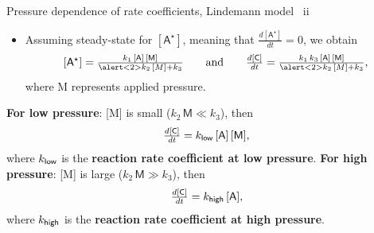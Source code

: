 \begin{frame}{Pressure dependence of rate coefficients, Lindemann model \, ii}
	\begin{itemize}
		\item Assuming steady-state for $\mathsf{[A^\star]}$, meaning that $\tfrac{d[\mathsf{A^\star}]}{dt} = 0$, we obtain
		\[
		\mathsf{[A^\star]} = \tfrac{k_1 \, \mathsf{[A]\, [M]}}{\alert<2>{k_2 \, [M]} + k_3} \qquad \mbox{and}  \qquad
		\tfrac{d\mathsf{[C]}}{dt} = \tfrac{k_1 \, k_3 \, \mathsf{[A]\, [M]}}{\alert<2>{k_2 \, [M]}  + k_3}, 
		\]
		where M represents applied pressure.\\[5pt]
	\end{itemize}
    \vskip 20pt
	\lcol
	{\bf For low pressure}: [M] is small ($k_2\, \mathsf{M} \ll k_3$), then 
	\[	
	\tfrac{d\mathsf{[C]}}{dt} = k_{\sf low} \, \mathsf{[A]\, [M]},
	\]
	where $k_{\sf low}$ is the {\bf reaction rate coefficient at low pressure}.
	\rcol
	{\bf For high pressure}: [M] is large  ($k_2\, \mathsf{M} \gg k_3$), then 
	\[	
	\tfrac{d\mathsf{[C]}}{dt} = k_{\sf high} \, \mathsf{[A]},
	\]
	where $k_{\sf high} $ is the {\bf reaction rate coefficient at high pressure}.
	\ecol
\end{frame}
%
